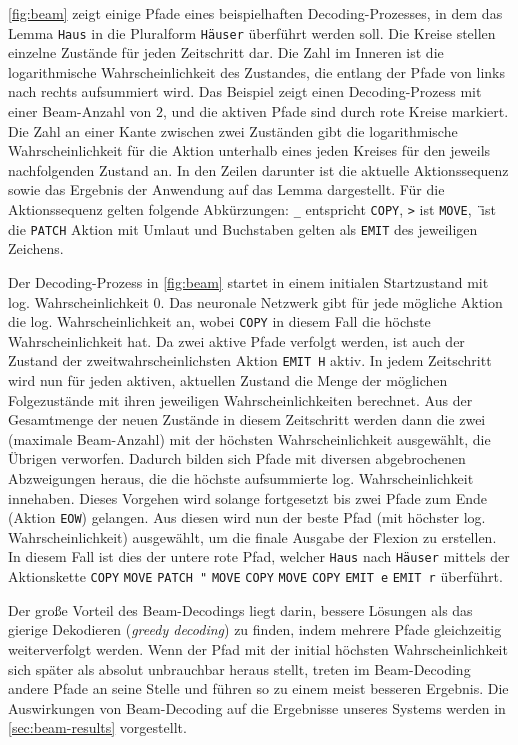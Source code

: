 \documentclass[11pt,a4paper]{article}
\newcommand{\action}[1]{\texttt{#1}}
\begin{document}
\autoref{fig:beam} zeigt einige Pfade eines beispielhaften Decoding-Prozesses, in dem das Lemma \texttt{Haus} in die Pluralform \texttt{Häuser} überführt werden soll.
Die Kreise stellen einzelne Zustände für jeden Zeitschritt dar.
Die Zahl im Inneren ist die logarithmische Wahrscheinlichkeit des Zustandes, die entlang der Pfade von links nach rechts aufsummiert wird.
Das Beispiel zeigt einen Decoding-Prozess mit einer Beam-Anzahl von $2$, und die aktiven Pfade sind durch rote Kreise markiert.
Die Zahl an einer Kante zwischen zwei Zuständen gibt die logarithmische Wahrscheinlichkeit für die Aktion unterhalb eines jeden Kreises für den jeweils nachfolgenden Zustand an.
In den Zeilen darunter ist die aktuelle Aktionssequenz sowie das Ergebnis der Anwendung auf das Lemma dargestellt.
Für die Aktionssequenz gelten folgende Abkürzungen: \texttt{\_} entspricht \action{COPY}, \texttt{>} ist \action{MOVE}, \texttt{\"} ist die \action{PATCH} Aktion mit Umlaut und Buchstaben gelten als \action{EMIT} des jeweiligen Zeichens.

Der Decoding-Prozess in \autoref{fig:beam} startet in einem initialen Startzustand mit log. Wahrscheinlichkeit $0$.
Das neuronale Netzwerk gibt für jede mögliche Aktion die log. Wahrscheinlichkeit an, wobei \action{COPY} in diesem Fall die höchste Wahrscheinlichkeit hat.
Da zwei aktive Pfade verfolgt werden, ist auch der Zustand der zweitwahrscheinlichsten Aktion \action{EMIT H} aktiv.
In jedem Zeitschritt wird nun für jeden aktiven, aktuellen Zustand die Menge der möglichen Folgezustände mit ihren jeweiligen Wahrscheinlichkeiten berechnet.
Aus der Gesamtmenge der neuen Zustände in diesem Zeitschritt werden dann die zwei (maximale Beam-Anzahl) mit der höchsten Wahrscheinlichkeit ausgewählt, die Übrigen verworfen.
Dadurch bilden sich Pfade mit diversen abgebrochenen Abzweigungen heraus, die die höchste aufsummierte log. Wahrscheinlichkeit innehaben.
Dieses Vorgehen wird solange fortgesetzt bis zwei Pfade zum Ende (Aktion \action{EOW}) gelangen.
Aus diesen wird nun der beste Pfad (mit höchster log. Wahrscheinlichkeit) ausgewählt, um die finale Ausgabe der Flexion zu erstellen.
In diesem Fall ist dies der untere rote Pfad, welcher \texttt{Haus} nach \texttt{Häuser} mittels der Aktionskette \action{COPY} \action{MOVE} \action{PATCH "} \action{MOVE} \action{COPY} \action{MOVE} \action{COPY} \action{EMIT e} \action{EMIT r} überführt.

Der große Vorteil des Beam-Decodings liegt darin, bessere Lösungen als das gierige Dekodieren (\textit{greedy decoding}) zu finden, indem mehrere Pfade gleichzeitig weiterverfolgt werden.
Wenn der Pfad mit der initial höchsten Wahrscheinlichkeit sich später als absolut unbrauchbar heraus stellt, treten im Beam-Decoding andere Pfade an seine Stelle und führen so zu einem meist besseren Ergebnis.
Die Auswirkungen von Beam-Decoding auf die Ergebnisse unseres Systems werden in \autoref{sec:beam-results} vorgestellt.
\end{document}
